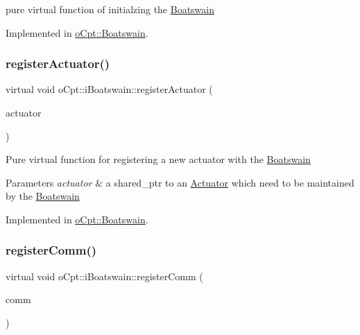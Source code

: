 pure virtual function of initialzing the \hyperlink{classo_cpt_1_1_boatswain}{Boatswain} 

Implemented in \hyperlink{classo_cpt_1_1_boatswain_aa1c27c710e2156402c3851ac189ea162}{o\+Cpt\+::\+Boatswain}.

\hypertarget{classo_cpt_1_1i_boatswain_a7915584ee17a28b1fc506a8968e27387}{}\label{classo_cpt_1_1i_boatswain_a7915584ee17a28b1fc506a8968e27387} 
\subsubsection{\texorpdfstring{register\+Actuator()}{registerActuator()}}
{\footnotesize\ttfamily virtual void o\+Cpt\+::i\+Boatswain\+::register\+Actuator (\begin{DoxyParamCaption}\item[{\hyperlink{classo_cpt_1_1i_actuator_a35847799558e92bb84fb6c71de772cac}{i\+Actuator\+::ptr}}]{actuator }\end{DoxyParamCaption})\hspace{0.3cm}{\ttfamily [pure virtual]}}

Pure virtual function for registering a new actuator with the \hyperlink{classo_cpt_1_1_boatswain}{Boatswain} 
\begin{DoxyParams}{Parameters}
{\em actuator} & a shared\+\_\+ptr to an \hyperlink{classo_cpt_1_1_actuator}{Actuator} which need to be maintained by the \hyperlink{classo_cpt_1_1_boatswain}{Boatswain} \\
\hline
\end{DoxyParams}


Implemented in \hyperlink{classo_cpt_1_1_boatswain_ae3f318352a331d64840ff87ad1ce3e8e}{o\+Cpt\+::\+Boatswain}.

\hypertarget{classo_cpt_1_1i_boatswain_aebae826c7516c1688e94d84de5606cac}{}\label{classo_cpt_1_1i_boatswain_aebae826c7516c1688e94d84de5606cac} 
\subsubsection{\texorpdfstring{register\+Comm()}{registerComm()}}
{\footnotesize\ttfamily virtual void o\+Cpt\+::i\+Boatswain\+::register\+Comm (\begin{DoxyParamCaption}\item[{\hyperlink{classo_cpt_1_1i_comm_af0c655f143251b7d03fcd98f89637228}{i\+Comm\+::ptr}}]{comm }\end{DoxyParamCaption})\hspace{0.3cm}{\ttfamily [pure virtual]}}

